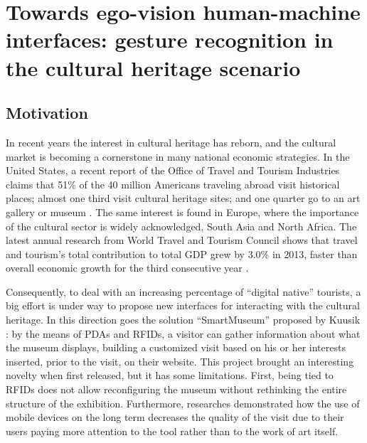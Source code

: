
\chapter{Towards ego-vision human-machine interfaces: gesture recognition in the cultural heritage scenario}


\section{Motivation}
In recent years the interest in cultural heritage has reborn, and the cultural market is becoming a cornerstone in many national economic strategies. In the United States, a recent report of the Office of Travel and Tourism Industries claims that 51\% of the 40 million Americans traveling abroad visit historical places; almost one third visit cultural heritage sites; and one quarter go to an art gallery or museum \cite{tourismintelligence}. The same interest is found in Europe, where the importance of the cultural sector is widely acknowledged, South Asia and North Africa. The latest annual research from World Travel and Tourism Council shows that travel and tourism's total contribution to total GDP grew by 3.0\% in 2013, faster than overall economic growth for the third consecutive year \cite{econotravel}.

Consequently, to deal with an increasing percentage of ``digital native'' tourists, a big effort is under way to propose new interfaces for interacting with the cultural heritage.
 In this direction goes the solution ``SmartMuseum'' proposed by Kuusik \etal \cite{kuusik2009smartmuseum}: by the means of PDAs and RFIDs, a visitor can gather information about what the museum displays, building a customized visit based on his or her interests inserted, prior to the visit, on their website. This project brought an interesting novelty when first released, but it has some limitations. First, being tied to RFIDs does not allow reconfiguring the museum without rethinking the entire structure of the exhibition. Furthermore, researches demonstrated how the use of mobile devices on the long term decreases the quality of the visit due to their users paying more attention to the tool rather than to the work of art itself.

